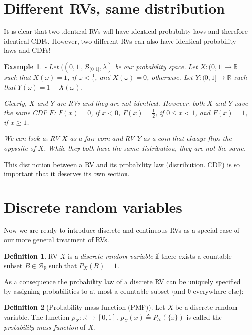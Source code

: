 \documentclass{book}
\theoremstyle{plain}%
\newtheorem{prototheorem}{Example}[section]
\newenvironment{cexample}
   {\colorlet{shadecolor}{gray!10}\begin{shaded}\begin{prototheorem}}
   {\end{prototheorem}\end{shaded}}
\theoremstyle{definition}
\newtheorem{definition}{Definition}[section]
\newlength{\arrow}
\begin{document}
\section{Different RVs, same distribution}

It is clear that two identical RVs will have identical probability laws and therefore identical CDFs. However, two different RVs can also have identical probability laws and CDFs!

\begin{cexample}{}{-}
Let $((0, 1], \mathcal{B}_{(0,1]}, \lambda)$ be our probability space. Let $X: (0, 1] \to \mathbb{R}$ such that $X(\omega) = 1$, if $\omega < \frac{1}{2}$, and $X(\omega) = 0$, otherwise. Let $Y: (0, 1] \to \mathbb{R}$ such that $Y(\omega) = 1 - X(\omega)$.

Clearly, $X$ and $Y$ are RVs and they are not identical. However, both $X$ and $Y$ have the same CDF $F$: $F(x) = 0$, if $x < 0$, $F(x) = \frac{1}{2}$, if $0 \leq x < 1$, and $F(x) = 1$, if $x \geq 1$.

We can look at RV $X$ as a fair coin and RV $Y$ as a coin that always flips the opposite of $X$. While they both have the same distribution, they are not the same.
\end{cexample}

This distinction between a RV and its probability law (distribution, CDF) is so important that it deserves its own section.

\section{Discrete random variables}

Now we are ready to introduce discrete and continuous RVs as a special case of our more general treatment of RVs.

\begin{definition}
RV $X$ is a \emph{discrete random variable} if there exists a countable subset $B \in \mathcal{B}_\mathbb{R}$ such that $P_X(B) = 1$.
\end{definition}

As a consequence the probability law of a discrete RV can be uniquely specified by assigning probabilities to at most a countable subset (and 0 everywhere else):

\begin{definition}[Probability mass function (PMF)]
Let $X$ be a discrete random variable. The function $p_X: \mathbb{R} \rightarrow [0,1]$, $p_X(x) \triangleq P_X(\{x\})$ is called the \emph{probability mass function} of $X$.
\end{definition}
\end{document}

